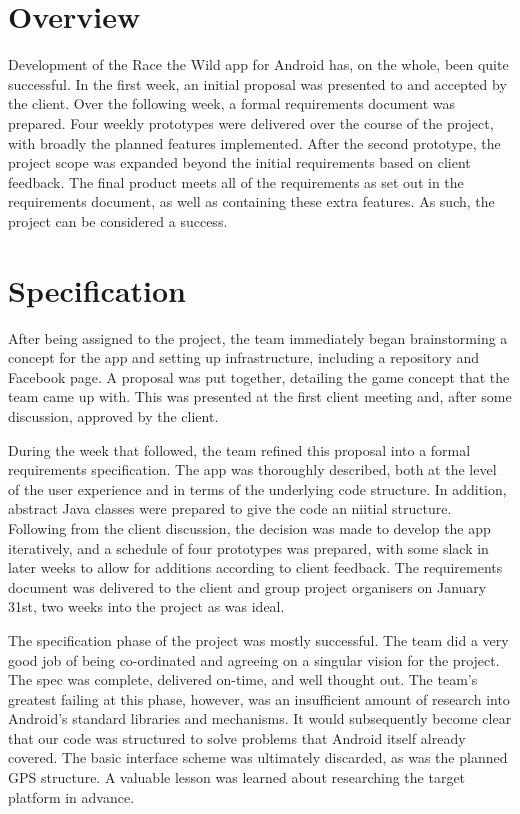 \documentclass[12pt,a4paper,twoside]{article}
\begin{document}

\newpage
\pagestyle{empty}
\cleardoublepage                             %
\newpage

\section{Overview}

Development of the Race the Wild app for Android has, on the whole, been quite successful. 
In the first week, an initial proposal was presented to and accepted by the client. 
Over the following week, a formal requirements document was prepared. 
Four weekly prototypes were delivered over the course of the project, with broadly the planned features implemented. 
After the second prototype, the project scope was expanded beyond the initial requirements based on client feedback. 
The final product meets all of the requirements as set out in the requirements document, as well as containing these extra features. 
As such, the project can be considered a success.

\section{Specification}

After being assigned to the project, the team immediately began brainstorming a concept for the app and setting up infrastructure, including a repository and Facebook page. 
A proposal was put together, detailing the game concept that the team came up with. 
This was presented at the first client meeting and, after some discussion, approved by the client.

During the week that followed, the team refined this proposal into a formal requirements specification. 
The app was thoroughly described, both at the level of the user experience and in terms of the underlying code structure. 
In addition, abstract Java classes were prepared to give the code an niitial structure. 
Following from the client discussion, the decision was made to develop the app iteratively, and a schedule of four prototypes was prepared, with some slack in later weeks to allow for additions according to client feedback. 
The requirements document was delivered to the client and group project organisers on January 31st, two weeks into the project as was ideal.

The specification phase of the project was mostly successful. 
The team did a very good job of being co-ordinated and agreeing on a singular vision for the project. 
The spec was complete, delivered on-time, and well thought out. 
The team's greatest failing at this phase, however, was an insufficient amount of research into Android's standard libraries and mechanisms. 
It would subsequently become clear that our code was structured to solve problems that Android itself already covered. 
The basic interface scheme was ultimately discarded, as was the planned GPS structure. 
A valuable lesson was learned about researching the target platform in advance.
\end{document}
